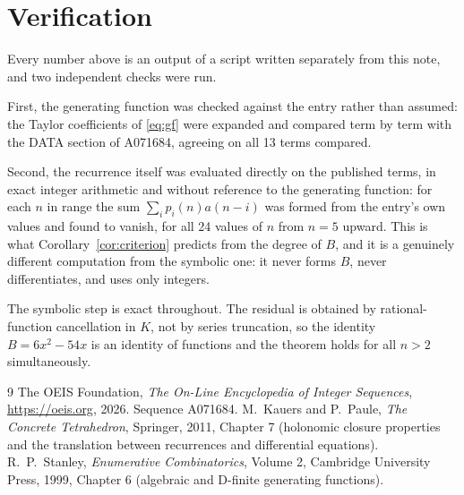 \documentclass[11pt,a4paper]{article}
\theoremstyle{plain}
\theoremstyle{definition}
\begin{document}
\section{Verification}

Every number above is an output of a script written separately from this note, and two
independent checks were run.

First, the generating function was checked against the entry rather than assumed: the
Taylor coefficients of \eqref{eq:gf} were expanded and compared term by term with the DATA
section of A071684, agreeing on all 13 terms compared.

Second, the recurrence itself was evaluated directly on the published terms, in exact
integer arithmetic and without reference to the generating function: for each $n$ in range
the sum $\sum_{i}p_{i}(n)a(n-i)$ was formed from the entry's own values and found to
vanish, for all 24 values of $n$ from $n=5$ upward. This is what
Corollary~\ref{cor:criterion} predicts from the degree of $B$, and it is a genuinely
different computation from the symbolic one: it never forms $B$, never differentiates, and
uses only integers.

The symbolic step is exact throughout. The residual is obtained by rational-function
cancellation in $K$, not by series truncation, so the identity $B=6 x^{2} - 54 x$ is an
identity of functions and the theorem holds for all $n>2$ simultaneously.

\begin{thebibliography}{9}
 The OEIS Foundation, \emph{The On-Line Encyclopedia of Integer Sequences},
\url{https://oeis.org}, 2026. Sequence A071684.
 M.~Kauers and P.~Paule, \emph{The Concrete Tetrahedron}, Springer, 2011,
Chapter 7 (holonomic closure properties and the translation between recurrences and
differential equations).
 R.~P.~Stanley, \emph{Enumerative Combinatorics}, Volume 2, Cambridge
University Press, 1999, Chapter 6 (algebraic and D-finite generating functions).
\end{thebibliography}
\end{document}
